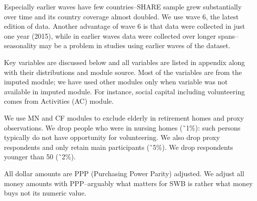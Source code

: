 \documentclass[10pt, letterpaper]{article}
\begin{document}
\begin{spacing}{1.4}
                                
Especially earlier waves have few countries--SHARE sample grew substantially
over time and its country coverage almost doubled.
We use  wave 6, the latest edition of data. Another advantage of wave 6 is that
data were collected in just one year (2015), %
while in earlier waves data were collected over longer spans--seasonality may be
a problem in studies using earlier waves of the dataset.

Key variables are discussed below and all variables are listed in appendix along
with their distributions and module source.
Most of the variables are from the imputed module; we have used other modules
only when variable was not available in imputed module. For instance, social capital including
volunteering comes from Activities (AC) module. 

 We use MN and CF modules to
exclude elderly in retirement homes and proxy observations.
%
We drop people who were in nursing homes (\~\ 1\%): such persons typically do
not have opportunity for volunteering. We also drop proxy respondents and only retain
main participants (\~\ 5\%). %
 We drop respondents younger than 50 (\~\ 2\%). %


All dollar amounts are PPP (Purchasing Power Parity) adjusted. We adjust all money amounts with
PPP--arguably what matters for SWB is rather what money buys not its numeric value.


\end{spacing}
\end{document}
